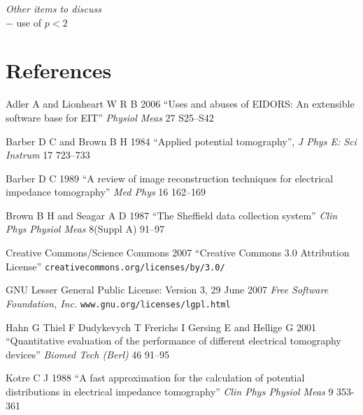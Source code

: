 \documentclass[12pt]{iopart}
\begin{document}
{\em Other items to discuss}
\\
$-$ use of $p<2$



\section*{References}

\References %
\item[]
Adler A and Lionheart W R B 2006
``Uses and abuses of EIDORS: An extensible software base for EIT''
{\em Physiol Meas}
27 S25--S42

\item[]
Barber D C and Brown B H 1984
``Applied potential tomography'', 
{\em J Phys E: Sci Instrum}
 17 723--733

\item[]
Barber D C 1989
``A review of image reconstruction techniques for electrical
 impedance tomography''
{\em Med Phys}
16 162--169

\item[]
Brown B H and Seagar A D 1987 
``The Sheffield data collection system''
{\em Clin Phys Physiol Meas}
 8(Suppl A) 91--97

\item[]
Creative Commons/Science Commons 2007
``Creative Commons 3.0 Attribution License''
\verb+creativecommons.org/licenses/by/3.0/+

\item[]
GNU Lesser General Public License: Version 3, 29 June 2007
{\em Free Software Foundation, Inc.}
\verb+www.gnu.org/licenses/lgpl.html+

\item[]
Hahn G Thiel F Dudykevych T Frerichs I Gersing E
and Hellige G 2001
``Quantitative evaluation of the performance of
different electrical tomography devices''
{\em  Biomed Tech (Berl)}
46 91--95


\item[]
Kotre C J 1988
``A fast approximation for the calculation of potential distributions in electrical impedance tomography''
{\em Clin Phys Physiol Meas}
9 353-361
\endrefs
\end{document}
